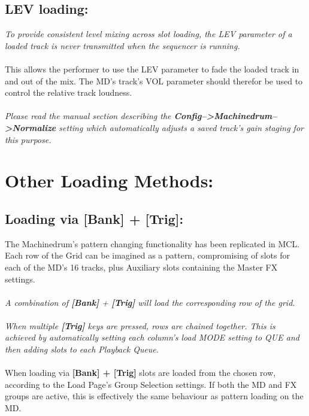 \section{LEV loading:}
\textit{To provide consistent level mixing across slot loading, the LEV parameter of a loaded track is never transmitted when the sequencer is running.}\\\\This allows the performer to use the LEV parameter to fade the loaded track in and out of the mix. The MD's track's VOL parameter should therefor be used to control the relative track loudness.\\\\
\textit{Please read the manual section describing the \textbf{Config-->Machinedrum-->Normalize} setting which automatically adjusts a saved track's gain staging for this purpose.}

\chapter{Other Loading Methods:}
\section{Loading via [Bank] + [Trig]:}
The Machinedrum's pattern changing functionality has been replicated in MCL. Each row of the Grid can be imagined as a pattern, compromising of slots for each of the MD's 16 tracks, plus Auxiliary slots containing the Master FX settings.\\
\\
\textit{A combination of \textbf{[Bank]} + \textbf{[Trig]} will load the corresponding row of the grid.\\\\
When multiple \textbf{[Trig]} keys are pressed, rows are chained together. This is achieved by automatically setting each column's load MODE setting to QUE and then adding slots to each Playback Queue.}
\\\\
When loading via \textbf{[Bank] + [Trig]} slots are loaded from the chosen row, according to the Load Page's Group Selection settings. If both the MD and FX groups are active, this is effectively the same behaviour as pattern loading on the MD.

